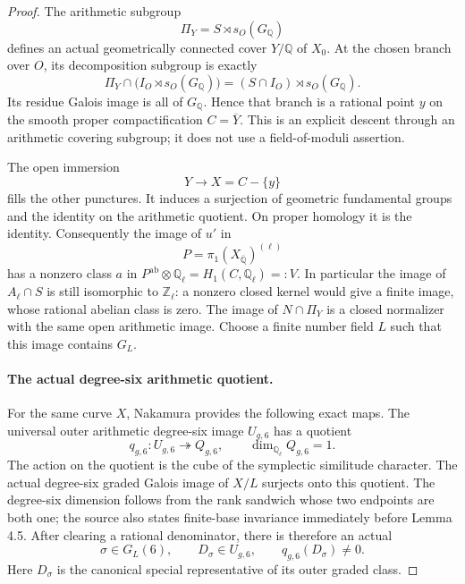 \begin{proof}
The arithmetic subgroup
\[
                  \Pi_Y=S\rtimes s_O(G_{\mathbb Q})
\]
defines an actual geometrically connected cover \(Y/\mathbb Q\)
of \(X_0\).  At the chosen branch over \(O\), its decomposition
subgroup is exactly
\[
 \Pi_Y\cap\bigl(I_O\rtimes s_O(G_{\mathbb Q})\bigr)
               =(S\cap I_O)\rtimes s_O(G_{\mathbb Q}).
\]
Its residue Galois image is all of \(G_{\mathbb Q}\).
Hence that branch is a rational point \(y\) on the smooth
proper compactification \(C=\overline Y\).
This is an explicit descent through an arithmetic covering
subgroup; it does not use a field-of-moduli assertion.

The open immersion
\[
                  Y\longrightarrow X=C-\{y\}
\]
fills the other punctures.  It induces a surjection of geometric
fundamental groups and the identity on the arithmetic quotient.
On proper homology it is the identity.
Consequently the image of \(u'\) in
\[
                         P=\pi_1(X_{\overline{\mathbb Q}})^{(\ell)}
\]
has a nonzero class \(a\) in
\(P^{\mathrm{ab}}\otimes\mathbb Q_\ell
 =H_1(C,\mathbb Q_\ell)=:V\).
In particular the image of \(A_\ell\cap S\) is still
isomorphic to \(\mathbb Z_\ell\): a nonzero closed kernel
would give a finite image, whose rational abelian class is zero.
The image of \(N\cap\Pi_Y\) is a closed normalizer with the
same open arithmetic image.
Choose a finite number field \(L\) such that this image
contains \(G_L\).

\paragraph{The actual degree-six arithmetic quotient.}
For the same curve \(X\), Nakamura
\cite[Corollary 4.2 and the table in 4.3, p.~115;
Lemma 4.5, p.~116; (4.7.1)--(4.7.2), p.~117]{Nakamura1996}
provides the following exact maps.
The universal outer arithmetic degree-six image \(U_{g,6}\)
has a quotient
\[
                  q_{g,6}:U_{g,6}\twoheadrightarrow Q_{g,6},
 \qquad \dim_{\mathbb Q_\ell}Q_{g,6}=1.
\]
The action on the quotient is the cube of the symplectic
similitude character.
The actual degree-six graded Galois image of \(X/L\)
surjects onto this quotient.
The degree-six dimension follows from the rank sandwich
whose two endpoints are both one; the source also states
finite-base invariance immediately before Lemma 4.5.
After clearing a rational denominator, there is therefore
an actual
\[
 \sigma\in G_L(6),\qquad D_\sigma\in U_{g,6},\qquad
                              q_{g,6}(D_\sigma)\neq0.
\]
Here \(D_\sigma\) is the canonical special representative
of its outer graded class.


\end{proof}
